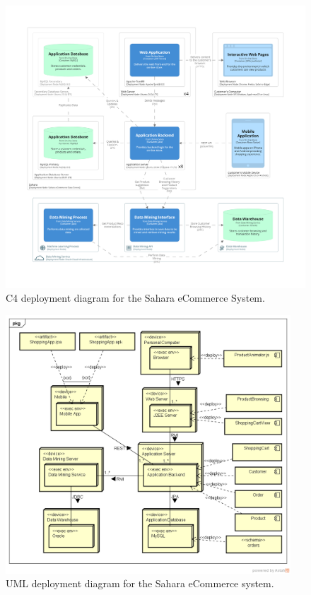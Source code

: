 \documentclass{csse4400}
\begin{document}
\begin{figure}[h!]
    \centering
    \begin{adjustwidth}{-7.5mm}{-7.5mm}
        \includegraphics[trim=195 235 195 198,clip,width=0.95\paperwidth]{../../notes/views/images/c4/deployment_diagram.png}
    \end{adjustwidth}
    \caption{C4 deployment diagram for the Sahara eCommerce System.}
    \label{fig:c4_deployment}
\end{figure}

\begin{figure}[h!]
    \centering
    \includegraphics[trim=38 50 23 45,clip,width=0.95\textwidth]{images/uml-deployment.png}
    \caption{UML deployment diagram for the Sahara eCommerce system.}
    \label{fig:uml_deployment}
\end{figure}
\end{document}
